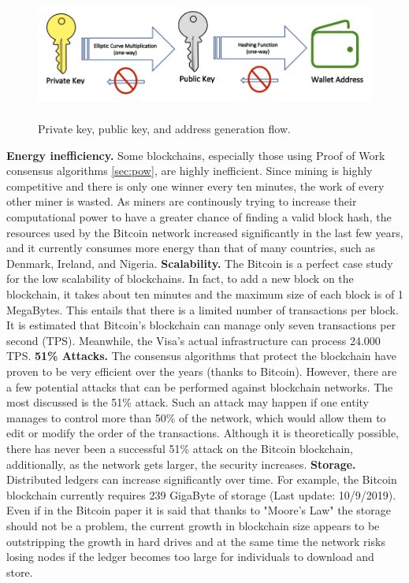\begin{figure}[h]
    \centering
    \includegraphics[height=4.3cm]{key_generation.png}
    \caption{Private key, public key, and address generation flow.\cite{key}}
    \label{fig:key}
\end{figure}\bigskip
\textbf{Energy inefficiency.}
Some blockchains, especially those using Proof of Work consensus algorithms \ref{sec:pow}, are 
highly inefficient. Since mining is highly competitive and there is 
only one winner every ten minutes, the work of every other miner is wasted.
As miners are continously trying to increase their computational power 
to have a greater chance of finding a valid block hash, the resources used 
by the Bitcoin network increased significantly in the last few years, and it 
currently consumes more energy than that of many countries, such as Denmark, Ireland, 
and Nigeria.\cite{binancevision}
\bigskip 
\textbf{Scalability.}
The Bitcoin is a perfect case study for the low scalability of blockchains.
In fact, to add a new block on the blockchain, it takes about ten minutes and
the maximum size of each block is of 1 MegaBytes. This entails that there is a
limited number of transactions per block. It is estimated that Bitcoin's 
blockchain can manage only seven transactions per second (TPS). Meanwhile, the
Visa's actual infrastructure can process 24.000 TPS.\cite{investopedia}\pagebreak
\bigskip 
\textbf{51\% Attacks.}
The consensus algorithms that protect the blockchain have proven to be very 
efficient over the years (thanks to Bitcoin). However, there are a few potential attacks that can 
be performed against blockchain networks. The most discussed is the  51\% attack.
Such an attack may happen if one entity manages to control more than 50\% of the 
network, which would allow them to edit or modify the order of the transactions.
Although it is theoretically possible, there has never been a successful 51\% attack on 
the Bitcoin blockchain, additionally, as the network gets larger, the security 
increases.\cite{binancevision}
\bigskip 
\textbf{Storage.}
Distributed ledgers can increase significantly over time. For example, the Bitcoin blockchain
currently requires 239 GigaByte of storage (Last update: 10/9/2019). Even if in 
the Bitcoin paper it is said that thanks to "Moore's Law"\cite{bitcoin} the storage should
not be a problem, the current growth in blockchain size appears to be outstripping the growth
in hard drives and at the same time the network risks losing nodes if the ledger becomes too large for 
individuals to download and store.\cite{binancevision}


